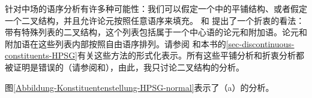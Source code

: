 针对中场的语序分析有许多种可能性：我们可以假定一个\gpsgc 中的平铺结构\citep{Kasper94a}、或者假定一个二叉结构，并且允许论元按照任意语序来填充。 \citet{Kathol2001a}和 \citet{Mueller99a,Mueller2002b,Mueller2004b}提出了一个折衷的看法：带有特殊列表的二叉结构，这个列表包括属于一个中心语的论元和附加语。论元和附加语在这些列表内部按照自由语序排列。请参阅 和本书的\ref{sec-discontinuous-constituents-HPSG}有关这些方法的形式化表示。所有这些平铺分析和折衷分析都被证明是错误的（请参阅\citealp{Mueller2005c,Mueller2004e}和\citealp[Section~9.5.1]{MuellerLehrbuch1}），由此，我只讨论二叉结构的分析。

图\vref{Abbildung-Konstituentenstellung-HPSG-normal}表示了（a）的分析。

